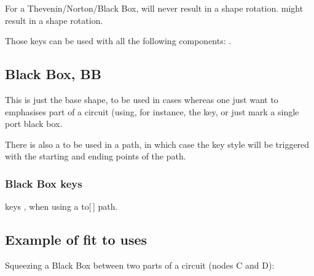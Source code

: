 \documentclass[a4paper, titlepage]{article}
\begin{document}
\begin{tsremark}
For a Thevenin/Norton/Black Box,  will never result in a shape rotation.    might result in a shape rotation.
\end{tsremark}
\begin{tsremark}
Those keys can be used with all the following components: .
\end{tsremark}


        
\subsection{Black Box, BB}
This is just the base shape, to be used in cases whereas one just want to emphasises part of a circuit (using, for instance, the  key, or just mark a single port black box.
\begin{tsremark}
There is also a  to be used in a  path, in which case the key  style will be triggered with the starting and ending points of the  path.
\end{tsremark}


\subsubsection{Black Box keys}
\begin{describelist*}[30mm]{keys}
    {, when using a to[\,] path.}
\end{describelist*}

\subsection{Example of fit to uses}
Squeezing a Black Box between two parts of a circuit (nodes C and D):
\end{document}
